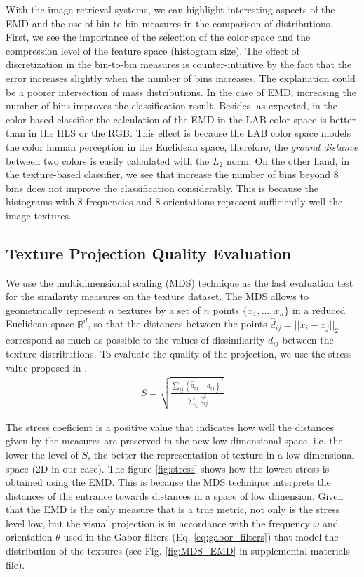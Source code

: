 With the image retrieval systems, we can highlight interesting aspects of the EMD and the use of bin-to-bin measures in the comparison of distributions. First, we see the importance of the selection of the color space and the compression level of the feature space (histogram size). The effect of discretization in the bin-to-bin measures is counter-intuitive by the fact that the error increases slightly when the number of bins increases. The explanation could be a poorer intersection of mass distributions. In the case of EMD, increasing the number of bins improves the classification result. Besides, as expected, in the color-based classifier the calculation of the EMD in the LAB color space is better than in the HLS or the RGB. This effect is because the LAB color space models the color human perception in the Euclidean space, therefore, the \textit{ground distance} between two colors is easily calculated with the $L_2$ norm. On the other hand, in the texture-based classifier, we see that increase the number of bins beyond 8 bins does not improve the classification considerably. This is because the histograms with 8 frequencies and 8 orientations represent sufficiently well the image textures. 

\subsection{Texture Projection Quality Evaluation} \label{subsec:mds}

We use the multidimensional scaling (MDS) technique \citep{Kruskal:Psycho:1964} as the last evaluation test for the similarity measures on the texture dataset. The MDS allows to geometrically represent $n$ textures by a set of $n$ points $\{x_1, \ldots, x_n\}$ in a reduced Euclidean space $\mathbb{R}^{d}$, so that the distances between the points $\hat{d}_{ij} = ||x_i-x_j||_2$ correspond as much as possible to the values of dissimilarity $d_{ij}$ between the texture distributions. To evaluate the quality of the projection, we use the stress value proposed in \citep{Kruskal:Psycho:1964}.
\begin{eqnarray}
S= \sqrt{\frac{\sum_{ij}(\hat{d}_{ij}-d_{ij})^2}{\sum_{ij}\hat{d}_{ij}^2}}
\label{eq:stress}
\end{eqnarray}

The stress coeficient is a positive value that indicates how well the distances given by the measures are preserved in the new low-dimensional space, i.e. the lower the level of $S$, the better the representation of texture in a low-dimensional space (2D in our case). The figure \ref{fig:stress} shows how the lowest stress is obtained using the EMD. This is because the MDS technique interprets the distances of the entrance towards distances in a space of low dimension. Given that the EMD is the only measure that is a true metric, not only is the stress level low, but the visual projection is in accordance with the frequency $\omega$ and orientation $\theta$ used in the Gabor filters (Eq. \ref{eq:gabor_filters}) that model the distribution of the textures (see Fig. \ref{fig:MDS_EMD} in supplemental materials file).

